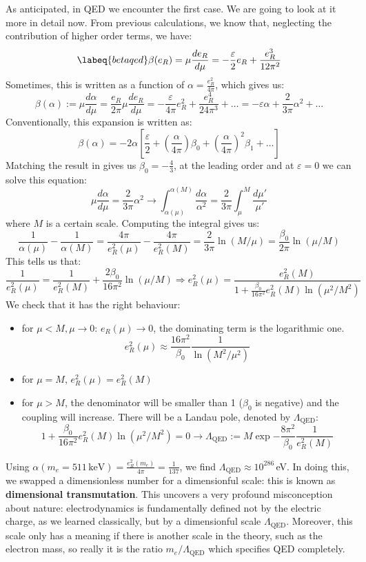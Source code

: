 \documentclass[../main.tex]{subfiles}
\begin{document}
As anticipated, in QED we encounter the first case. We are going to look at it more in detail now. From previous calculations, we know that, neglecting the contribution of higher order terms, we have:
\begin{equation}
\labeq{betaqed}
\beta(e_R)=\mu\frac{de_R}{d\mu}=-\frac{\varepsilon}{2}e_R+\frac{e_R^3}{12\pi^2}
\end{equation}
Sometimes, this is written as a function of $\alpha=\frac{e_R^2}{4\pi}$, which gives us:
\[
\beta(\alpha):=\mu\frac{d\alpha}{d\mu}=\frac{e_R}{2\pi}\mu\frac{de_R}{d\mu}=-\frac{\varepsilon}{4\pi}e_R^2+\frac{e_R^4}{24\pi^3}+\dots=-\varepsilon\alpha+\frac{2}{3\pi}\alpha^2+\dots
\]
Conventionally, this expansion is written as:
\[
\beta(\alpha)=-2\alpha\left[\frac{\varepsilon}{2}+\left(\frac{\alpha}{4\pi}\right)\beta_0+\left(\frac{\alpha}{4\pi}\right)^2\beta_1+\dots\right]
\]
Matching the result in  gives us $\beta_0=-\frac{4}{3}$, at the leading order and at $\varepsilon=0$ we can solve this equation:
\[
\mu\frac{d\alpha}{d\mu}=\frac{2}{3\pi}\alpha^2\to\int_{\alpha(\mu)}^{\alpha(M)}\frac{d\alpha}{\alpha^2}=\frac{2}{3\pi}\int_\mu^M\frac{d\mu'}{\mu'}
\]
where $M$ is a certain scale. Computing the integral gives us:
\[
\frac{1}{\alpha(\mu)}-\frac{1}{\alpha(M)}=\frac{4\pi}{e_R^2(\mu)}-\frac{4\pi}{e_R^2(M)}=\frac{2}{3\pi}\ln{(M/\mu)}=\frac{\beta_0}{2\pi}\ln{(\mu/M)}
\]
This tells us that:
\[
\frac{1}{e_R^2(\mu)}=\frac{1}{e_R^2(M)}+\frac{2\beta_0}{16\pi^2}\ln(\mu/M)\Rightarrow e_R^2(\mu)=\frac{e_R^2(M)}{1+\frac{\beta_0}{16\pi^2}e_R^2(M)\ln(\mu^2/M^2)}
\]
We check that it has the right behaviour:
\begin{itemize}
    \item for $\mu<M, \mu\to0$: $e_R(\mu)\to0$, the dominating term is the logarithmic one.
    \[
    e_R^2(\mu)\approx\frac{16\pi^2}{\beta_0}\frac{1}{\ln(M^2/\mu^2)}
    \]
    \item for $\mu=M$, $e_R^2(\mu)=e_R^2(M)$
    \item for $\mu>M$, the denominator will be smaller than 1 ($\beta_0$ is negative) and the coupling will increase. There will be a Landau pole, denoted by $\Lambda_{\text{QED}}$:
    \[
    1+\frac{\beta_0}{16\pi^2}e_R^2(M)\ln(\mu^2/M^2)=0\to\Lambda_{\text{QED}}:=M\exp{-\frac{8\pi^2}{\beta_0}\frac{1}{e_R^2(M)}}
    \]
\end{itemize}
Using $\alpha(m_e=511\,\text{keV})=\frac{e_R^2(m_e)}{4\pi}=\frac{1}{137}$, we find $\Lambda_{\text{QED}}\approx10^{286}$\,eV. In doing this, we swapped a dimensionless number for a dimensionful scale: this is known as \textbf{dimensional transmutation}. This uncovers a very profound misconception about nature: electrodynamics is fundamentally defined not by the electric charge, as we learned classically, but by a dimensionful scale $\Lambda_{\text{QED}}$. Moreover, this scale only has a meaning if there is another scale in the theory, such as the electron mass, so really it is the ratio $m_e/\Lambda_{\text{QED}}$ which specifies QED completely.\\
\end{document}
